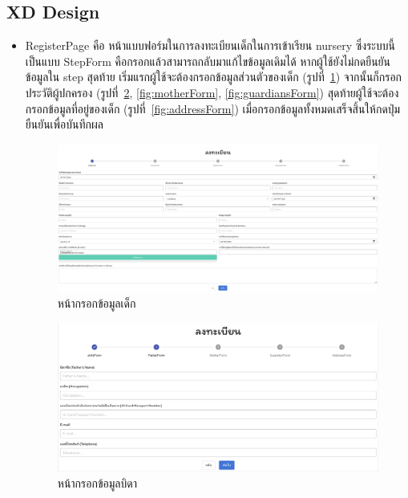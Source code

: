 \subsection{XD Design}

\begin{itemize}
  \item RegisterPage คือ หน้าแบบฟอร์มในการลงทะเบียนเด็กในการเข้าเรียน nursery 
  ซึ่งระบบนี้เป็นแบบ StepForm คือกรอกแล้วสามารถกลับมาแก้ไขข้อมูลเดิมได้ หากผู้ใช้ยังไม่กดยืนยันข้อมูลใน step สุดท้าย
  เริ่มแรกผู้ใช้จะต้องกรอกข้อมูลส่วนตัวของเด็ก (รูปที่~\ref{fig:register}) 
  จากนั้นก็กรอกประวัติผู้ปกครอง (รูปที่~\ref{fig:fatherForm}, \ref{fig:motherForm}, \ref{fig:guardiansForm})
  สุดท้ายผู้ใช้จะต้องกรอกข้อมูลที่อยู่ของเด็ก (รูปที่~\ref{fig:addressForm}) เมื่อกรอกข้อมูลทั้งหมดเสร็จสิ้นให้กดปุ่มยืนยันเพื่อบันทึกผล
  
    \begin{figure}
      \begin{center}
      \includegraphics[width=\linewidth]{images/RegisterForm.png}
      \end{center}
      \caption[หน้ากรอกข้อมูลเด็ก]{หน้ากรอกข้อมูลเด็ก}
      \label{fig:register}
    \end{figure}
  
  
    \begin{figure}
      \begin{center}
      \includegraphics[width=\linewidth]{images/fatherForm.png}
      \end{center}
      \caption[หน้ากรอกข้อมูลบิดา]{หน้ากรอกข้อมูลบิดา}
      \label{fig:fatherForm}
    \end{figure}
  

\end{itemize}
